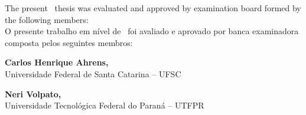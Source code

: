 \begin{folhadeaprovacao}
  \OnehalfSpacing
  \centering
  \begin{center}
    {\imprimirautor}

    \begin{center}
      \ABNTEXchapterfont\bfseries\MakeUppercase{\imprimirtitulo}\ifnotempty{\imprimirsubtitulo}{: \imprimirsubtitulo}
    \end{center}

    \begin{minipage}{\textwidth}
      \begin{center}
        \lang
        {
          The present \imprimirnivel~thesis was evaluated and approved by examination board formed
          by the following members:\\
        }
        {
          O presente trabalho em nível de \imprimirnivel~foi avaliado e
          aprovado por banca examinadora composta pelos seguintes membros:\\
        }
      \end{center}
    \end{minipage}%

    \vspace*{\baselineskip}
    \textbf{Carlos Henrique Ahrens, } \\
    Universidade Federal de Santa Catarina -- UFSC

    \vspace*{\baselineskip}
    \textbf{Neri Volpato, } \\
    Universidade Tecnológica Federal do Paraná -- UTFPR



\end{center}
\end{folhadeaprovacao}
